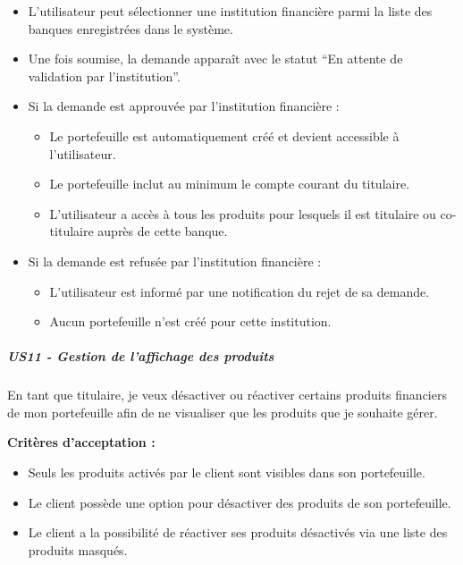 \begin{itemize}
\tightlist
\item
  L'utilisateur peut sélectionner une institution financière parmi la
  liste des banques enregistrées dans le système.
\item
  Une fois soumise, la demande apparaît avec le statut ``En attente de
  validation par l'institution''.
\item
  Si la demande est approuvée par l'institution financière :

  \begin{itemize}
  \tightlist
  \item
    Le portefeuille est automatiquement créé et devient accessible à
    l'utilisateur.
  \item
    Le portefeuille inclut au minimum le compte courant du titulaire.
  \item
    L'utilisateur a accès à tous les produits pour lesquels il est
    titulaire ou co-titulaire auprès de cette banque.
  \end{itemize}
\item
  Si la demande est refusée par l'institution financière :

  \begin{itemize}
  \tightlist
  \item
    L'utilisateur est informé par une notification du rejet de sa
    demande.
  \item
    Aucun portefeuille n'est créé pour cette institution.
  \end{itemize}
\end{itemize}

\hypertarget{us11---gestion-de-laffichage-des-produits}{%
\subparagraph{US11 - Gestion de l'affichage des
produits}\label{us11---gestion-de-laffichage-des-produits}}

En tant que titulaire, je veux désactiver ou réactiver certains produits
financiers de mon portefeuille afin de ne visualiser que les produits
que je souhaite gérer.

\textbf{Critères d'acceptation :}

\begin{itemize}
\tightlist
\item
  Seuls les produits activés par le client sont visibles dans son
  portefeuille.
\item
  Le client possède une option pour désactiver des produits de son
  portefeuille.
\item
  Le client a la possibilité de réactiver ses produits désactivés via
  une liste des produits masqués.
\end{itemize}

